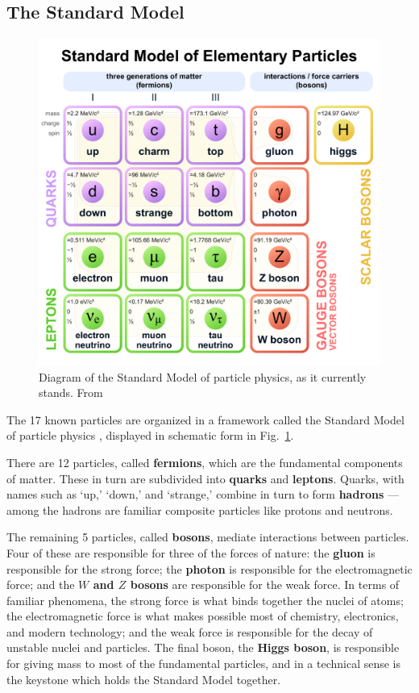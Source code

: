 \documentclass[../thesis.tex]{subfiles}
\begin{document}
\subsection{The Standard Model}
	\begin{figure}
	\begin{centering}
		\includegraphics[width=\textwidth]{figures/Standard_Model_of_Elementary_Particles.pdf}
		\caption{\label{intro-fig:standard model}Diagram of the Standard Model of particle physics, as it currently stands. From \cite{cush_standard_2019}}
	\end{centering}
	\end{figure} 
	The 17 known particles are organized in a framework called the Standard Model of particle physics \cite{larkoski_elementary_2019-1,schwartz_quantum_2014}, displayed in schematic form in Fig.~\ref{intro-fig:standard model}.

	There are 12 particles, called \textbf{fermions}, which are the fundamental components of matter. These in turn are subdivided into \textbf{quarks} and \textbf{leptons}. Quarks, with names such as `up,' `down,' and `strange,' combine in turn to form \textbf{hadrons} --- among the hadrons are familiar composite particles like protons and neutrons. 

	The remaining 5 particles, called \textbf{bosons}, mediate interactions between particles. Four of these are responsible for three of the forces of nature: the \textbf{gluon} is responsible for the strong force; the \textbf{photon} is responsible for the electromagnetic force; and the \textbf{$W$ and $Z$ bosons} are responsible for the weak force. In terms of familiar phenomena, the strong force is what binds together the nuclei of atoms; the electromagnetic force is what makes possible most of chemistry, electronics, and modern technology; and the weak force is responsible for the decay of unstable nuclei and particles. The final boson, the \textbf{Higgs boson}, is responsible for giving mass to most of the fundamental particles, and in a technical sense is the keystone which holds the Standard Model together.
\end{document}
